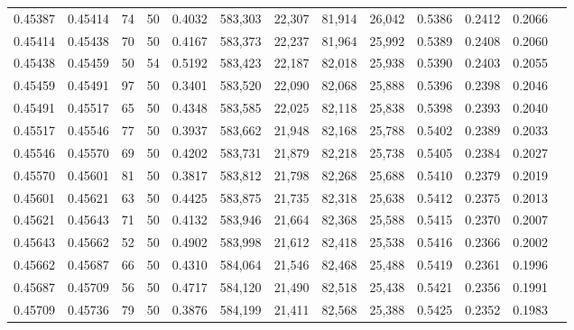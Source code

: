 \begin{tabular}{rrrrrrrrrrrrr}
0.45387 & 0.45414 &    74 &  50 &                                     0.4032 & 583,303 &  22,307 &  81,914 &  26,042 & 0.5386 & 0.2412 & 0.2066 \\
0.45414 & 0.45438 &    70 &  50 &                                     0.4167 & 583,373 &  22,237 &  81,964 &  25,992 & 0.5389 & 0.2408 & 0.2060 \\
0.45438 & 0.45459 &    50 &  54 &                                     0.5192 & 583,423 &  22,187 &  82,018 &  25,938 & 0.5390 & 0.2403 & 0.2055 \\
0.45459 & 0.45491 &    97 &  50 &                                     0.3401 & 583,520 &  22,090 &  82,068 &  25,888 & 0.5396 & 0.2398 & 0.2046 \\
0.45491 & 0.45517 &    65 &  50 &                                     0.4348 & 583,585 &  22,025 &  82,118 &  25,838 & 0.5398 & 0.2393 & 0.2040 \\
0.45517 & 0.45546 &    77 &  50 &                                     0.3937 & 583,662 &  21,948 &  82,168 &  25,788 & 0.5402 & 0.2389 & 0.2033 \\
0.45546 & 0.45570 &    69 &  50 &                                     0.4202 & 583,731 &  21,879 &  82,218 &  25,738 & 0.5405 & 0.2384 & 0.2027 \\
0.45570 & 0.45601 &    81 &  50 &                                     0.3817 & 583,812 &  21,798 &  82,268 &  25,688 & 0.5410 & 0.2379 & 0.2019 \\
0.45601 & 0.45621 &    63 &  50 &                                     0.4425 & 583,875 &  21,735 &  82,318 &  25,638 & 0.5412 & 0.2375 & 0.2013 \\
0.45621 & 0.45643 &    71 &  50 &                                     0.4132 & 583,946 &  21,664 &  82,368 &  25,588 & 0.5415 & 0.2370 & 0.2007 \\
0.45643 & 0.45662 &    52 &  50 &                                     0.4902 & 583,998 &  21,612 &  82,418 &  25,538 & 0.5416 & 0.2366 & 0.2002 \\
0.45662 & 0.45687 &    66 &  50 &                                     0.4310 & 584,064 &  21,546 &  82,468 &  25,488 & 0.5419 & 0.2361 & 0.1996 \\
0.45687 & 0.45709 &    56 &  50 &                                     0.4717 & 584,120 &  21,490 &  82,518 &  25,438 & 0.5421 & 0.2356 & 0.1991 \\
0.45709 & 0.45736 &    79 &  50 &                                     0.3876 & 584,199 &  21,411 &  82,568 &  25,388 & 0.5425 & 0.2352 & 0.1983 \\

\end{tabular}
